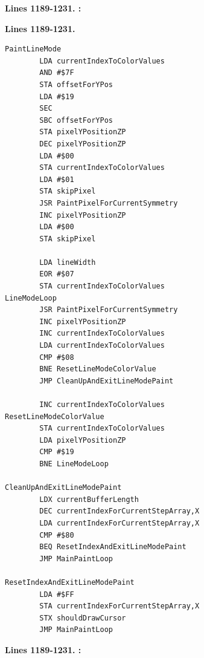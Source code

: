 \clearpage

\textbf{Lines 1189-1231. :} 
\clearpage

\clearpage
\textbf{Lines 1189-1231. } 
\begin{lstlisting}[caption=From \icode{PaintLineMode}.]
PaintLineMode 
        LDA currentIndexToColorValues
        AND #$7F
        STA offsetForYPos
        LDA #$19
        SEC 
        SBC offsetForYPos
        STA pixelYPositionZP
        DEC pixelYPositionZP
        LDA #$00
        STA currentIndexToColorValues
        LDA #$01
        STA skipPixel
        JSR PaintPixelForCurrentSymmetry
        INC pixelYPositionZP
        LDA #$00
        STA skipPixel

        LDA lineWidth
        EOR #$07
        STA currentIndexToColorValues
LineModeLoop   
        JSR PaintPixelForCurrentSymmetry
        INC pixelYPositionZP
        INC currentIndexToColorValues
        LDA currentIndexToColorValues
        CMP #$08
        BNE ResetLineModeColorValue
        JMP CleanUpAndExitLineModePaint

        INC currentIndexToColorValues
ResetLineModeColorValue   
        STA currentIndexToColorValues
        LDA pixelYPositionZP
        CMP #$19
        BNE LineModeLoop

CleanUpAndExitLineModePaint    
        LDX currentBufferLength
        DEC currentIndexForCurrentStepArray,X
        LDA currentIndexForCurrentStepArray,X
        CMP #$80
        BEQ ResetIndexAndExitLineModePaint
        JMP MainPaintLoop

ResetIndexAndExitLineModePaint   
        LDA #$FF
        STA currentIndexForCurrentStepArray,X
        STX shouldDrawCursor
        JMP MainPaintLoop
\end{lstlisting}
\clearpage

\textbf{Lines 1189-1231. :} 
\clearpage
